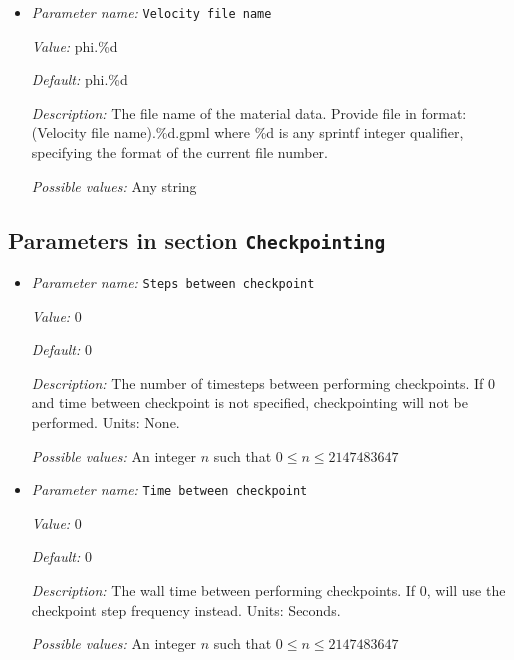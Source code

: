 \begin{itemize}
{\it Possible values:} A floating point number $v$ such that $-\text{MAX\_DOUBLE} \leq v \leq \text{MAX\_DOUBLE}$
\item {\it Parameter name:} {\tt Velocity file name}
\label{parameters:Boundary velocity model/GPlates model/Velocity file name}
\label{parameters:Boundary_20velocity_20model/GPlates_20model/Velocity_20file_20name}


{\it Value:} phi.\%d


{\it Default:} phi.\%d


{\it Description:} The file name of the material data. Provide file in format: (Velocity file name).\%d.gpml where \%d is any sprintf integer qualifier, specifying the format of the current file number.


{\it Possible values:} Any string
\end{itemize}

\subsection{Parameters in section \tt Checkpointing}
\label{parameters:Checkpointing}

\begin{itemize}
\item {\it Parameter name:} {\tt Steps between checkpoint}
\label{parameters:Checkpointing/Steps between checkpoint}
\label{parameters:Checkpointing/Steps_20between_20checkpoint}


{\it Value:} 0


{\it Default:} 0


{\it Description:} The number of timesteps between performing checkpoints. If 0 and time between checkpoint is not specified, checkpointing will not be performed. Units: None.


{\it Possible values:} An integer $n$ such that $0\leq n \leq 2147483647$
\item {\it Parameter name:} {\tt Time between checkpoint}
\label{parameters:Checkpointing/Time between checkpoint}
\label{parameters:Checkpointing/Time_20between_20checkpoint}


{\it Value:} 0


{\it Default:} 0


{\it Description:} The wall time between performing checkpoints. If 0, will use the checkpoint step frequency instead. Units: Seconds.


{\it Possible values:} An integer $n$ such that $0\leq n \leq 2147483647$
\end{itemize}

